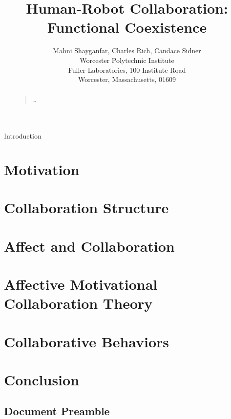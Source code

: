 \documentclass[letterpaper]{article}
\begin{document}
%
\title{Human-Robot Collaboration: Functional Coexistence}
\author{Mahni Shayganfar, Charles Rich, Candace Sidner\\
Worcester Polytechnic Institute\\
Fuller Laboratories, 100 Institute Road\\
Worcester, Massachusetts, 01609\\
}
\maketitle
\begin{abstract}
\begin{quote}
\ldots 
\end{quote}
\end{abstract}

\noindent Introduction

\section{Motivation}

\section{Collaboration Structure}

\section{Affect and Collaboration}

\section{Affective Motivational Collaboration Theory}

\section{Collaborative Behaviors}

\section{Conclusion}

\subsection{Document Preamble}
\end{document}

